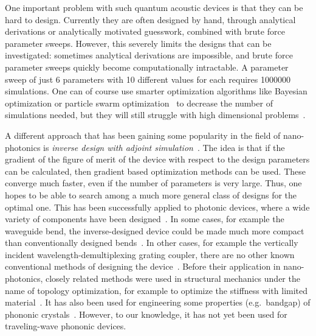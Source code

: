 One important problem with such quantum acoustic devices is that they can be hard to design.
Currently they are often designed by hand,
through analytical derivations or analytically motivated guesswork,
combined with brute force parameter sweeps.
However, this severely limits the designs that can be investigated:
sometimes analytical derivations are impossible, and brute force parameter
sweeps quickly become computationally intractable.
A parameter sweep of just 6 parameters with 10 different values for each
requires \num{1000000} simulations.
One can of course use smarter optimization algorithms like Bayesian optimization
or particle swarm optimization~\cite{schneider2019benchmarking,zhang_compact_2013}
to decrease the number of simulations needed,
but they will still struggle with high dimensional
problems~\cite{chen_measuring_2015}.

A different approach that has been gaining some popularity in the field of
nano-photonics is \emph{inverse design with adjoint
simulation}~\cite{molesky_inverse_2018}.
The idea is that if the gradient of the figure of merit of the device
with respect to the design parameters can be calculated, then gradient based
optimization methods can be used.
These converge much faster, even if the number of
parameters is very large. Thus, one hopes to be able to search
among a much more general class of designs for the optimal one.
This has been successfully applied to photonic devices,
where a wide variety of components have been designed~\cite{spins2019}.
In some cases, for example the waveguide bend, the inverse-designed device could
be made much more compact than conventionally designed
bends~\cite{jensen_systematic_2004}.
In other cases, for example the vertically incident wavelength-demultiplexing
grating coupler, there are no other known conventional methods of designing the
device~\cite{piggott_inverse_2014}.
Before their application in nano-photonics, closely related methods were used in
structural mechanics under the name of topology
optimization, for example to optimize the stiffness with limited material~\cite{sigmund_topology_2013}.
It has also been used for engineering some properties (e.g.\ bandgap) of
phononic crystals~\cite{yi_comprehensive_2016}.
However, to our knowledge, it has not yet been used for traveling-wave phononic devices.

